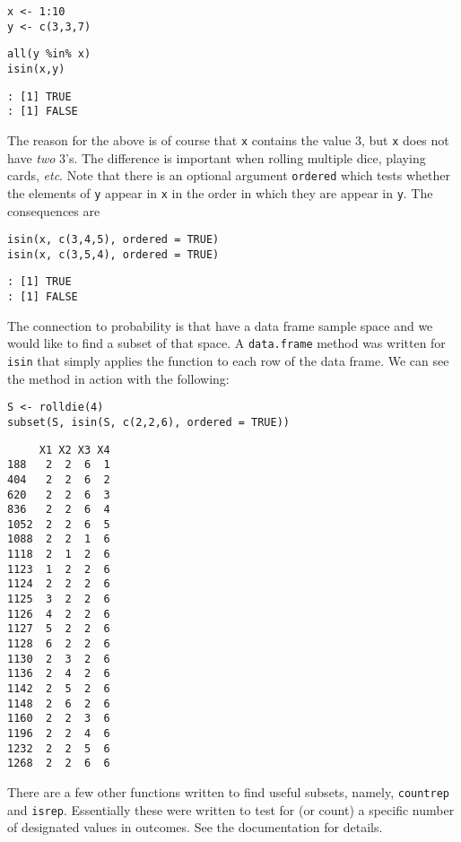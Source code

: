 \begin{verbatim}
x <- 1:10 
y <- c(3,3,7) 
\end{verbatim}

\begin{verbatim}
all(y %in% x)
isin(x,y) 
\end{verbatim}

\begin{verbatim}
: [1] TRUE
: [1] FALSE
\end{verbatim}

The reason for the above is of course that \texttt{x} contains the value 3,
but \texttt{x} does not have \emph{two} 3's. The difference is important when
rolling multiple dice, playing cards, \emph{etc}. Note that there is an
optional argument \texttt{ordered} which tests whether the elements of \texttt{y}
appear in \texttt{x} in the order in which they are appear in \texttt{y}. The
consequences are

\begin{verbatim}
isin(x, c(3,4,5), ordered = TRUE) 
isin(x, c(3,5,4), ordered = TRUE) 
\end{verbatim}

\begin{verbatim}
: [1] TRUE
: [1] FALSE
\end{verbatim}

The connection to probability is that have a data frame sample space
and we would like to find a subset of that space. A \texttt{data.frame}
method was written for \texttt{isin} that simply applies the function to each
row of the data frame. We can see the method in action with the
following:

\begin{verbatim}
S <- rolldie(4) 
subset(S, isin(S, c(2,2,6), ordered = TRUE)) 
\end{verbatim}

\begin{verbatim}
     X1 X2 X3 X4
188   2  2  6  1
404   2  2  6  2
620   2  2  6  3
836   2  2  6  4
1052  2  2  6  5
1088  2  2  1  6
1118  2  1  2  6
1123  1  2  2  6
1124  2  2  2  6
1125  3  2  2  6
1126  4  2  2  6
1127  5  2  2  6
1128  6  2  2  6
1130  2  3  2  6
1136  2  4  2  6
1142  2  5  2  6
1148  2  6  2  6
1160  2  2  3  6
1196  2  2  4  6
1232  2  2  5  6
1268  2  2  6  6
\end{verbatim}

There are a few other functions written to find useful subsets,
namely, \texttt{countrep} and \texttt{isrep}. Essentially these were written to test
for (or count) a specific number of designated values in outcomes. See
the documentation for details.

